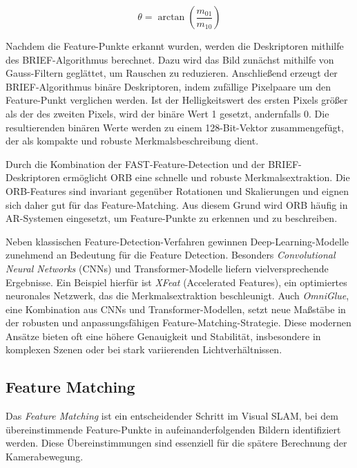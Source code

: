 \begin{equation}
    \theta = \arctan \left( \frac{m_{01}}{m_{10}} \right)
\end{equation}

Nachdem die Feature-Punkte erkannt wurden, werden die Deskriptoren mithilfe des BRIEF-Algorithmus berechnet. Dazu wird das Bild zunächst mithilfe von Gauss-Filtern geglättet, um Rauschen zu reduzieren. Anschließend erzeugt der BRIEF-Algorithmus binäre Deskriptoren, indem zufällige Pixelpaare um den Feature-Punkt verglichen werden. Ist der Helligkeitswert des ersten Pixels größer als der des zweiten Pixels, wird der binäre Wert 1 gesetzt, andernfalls 0. Die resultierenden binären Werte werden zu einem 128-Bit-Vektor zusammengefügt, der als kompakte und robuste Merkmalsbeschreibung dient. \cite{gao2021vSLAM, calonder2010brief}

Durch die Kombination der FAST-Feature-Detection und der BRIEF-Deskriptoren ermöglicht ORB eine schnelle und robuste Merkmalsextraktion. Die ORB-Features sind invariant gegenüber Rotationen und Skalierungen und eignen sich daher gut für das Feature-Matching. Aus diesem Grund wird ORB häufig in AR-Systemen eingesetzt, um Feature-Punkte zu erkennen und zu beschreiben. \cite{gao2021vSLAM, rublee2011orb}

Neben klassischen Feature-Detection-Verfahren gewinnen Deep-Learning-Modelle zunehmend an Bedeutung für die Feature Detection. Besonders \emph{Convolutional Neural Networks} (CNNs) und Transformer-Modelle liefern vielversprechende Ergebnisse. Ein Beispiel hierfür ist \emph{XFeat} (Accelerated Features), ein optimiertes neuronales Netzwerk, das die Merkmalsextraktion beschleunigt. Auch \emph{OmniGlue}, eine Kombination aus CNNs und Transformer-Modellen, setzt neue Maßstäbe in der robusten und anpassungsfähigen Feature-Matching-Strategie. Diese modernen Ansätze bieten oft eine höhere Genauigkeit und Stabilität, insbesondere in komplexen Szenen oder bei stark variierenden Lichtverhältnissen. \cite{ghosh2024fmNN}

\subsection{Feature Matching}

Das \emph{Feature Matching} ist ein entscheidender Schritt im Visual SLAM, bei dem übereinstimmende Feature-Punkte in aufeinanderfolgenden Bildern identifiziert werden. Diese Übereinstimmungen sind essenziell für die spätere Berechnung der Kamerabewegung. \cite{gao2021vSLAM, szeliski2022computerVision}

